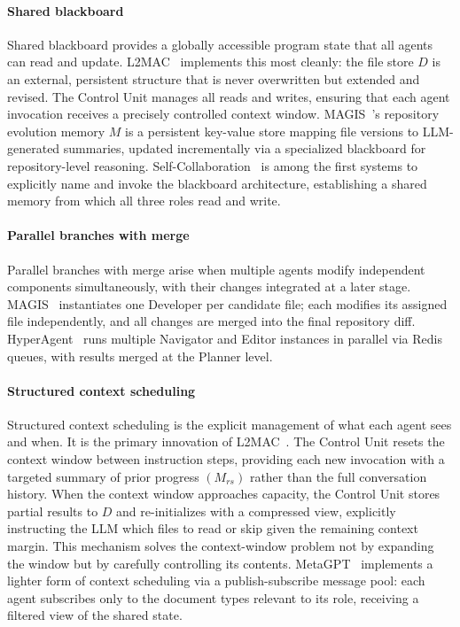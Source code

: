\paragraph{Shared blackboard} Shared blackboard provides a
globally accessible program state that all agents can read and
update. L2MAC~\cite{Holt2023L2MAC} implements this most cleanly:
the file store $D$ is an external, persistent structure that is
never overwritten but extended and revised. The Control Unit
manages all reads and writes, ensuring that each agent invocation
receives a precisely controlled context window.
MAGIS~\cite{Tao2024Magis}'s repository evolution memory $M$ is a
persistent key-value store mapping file versions to
LLM-generated summaries, updated incrementally via a specialized
blackboard for repository-level reasoning.
Self-Collaboration~\cite{Dong2024SelfCollaboration} is among the
first systems to explicitly name and invoke the blackboard
architecture, establishing a shared memory from which all three
roles read and write.

\paragraph{Parallel branches with merge} Parallel branches with
merge arise when multiple agents modify independent components
simultaneously, with their changes integrated at a later stage.
MAGIS~\cite{Tao2024Magis} instantiates one Developer per
candidate file; each modifies its assigned file independently,
and all changes are merged into the final repository diff.
HyperAgent~\cite{Phan2024HyperAgent} runs multiple Navigator and
Editor instances in parallel via Redis queues, with results
merged at the Planner level.

\paragraph{Structured context scheduling} Structured context
scheduling is the explicit management of what each agent sees and
when. It is the primary innovation of
L2MAC~\cite{Holt2023L2MAC}. The Control Unit resets the context
window between instruction steps, providing each new invocation
with a targeted summary of prior progress $(M_{rs})$ rather than
the full conversation history. When the context window approaches
capacity, the Control Unit stores partial results to $D$ and
re-initializes with a compressed view, explicitly instructing the
LLM which files to read or skip given the remaining context
margin. This mechanism solves the context-window problem not by
expanding the window but by carefully controlling its contents.
MetaGPT~\cite{Hong2023MetaGPT} implements a lighter form of
context scheduling via a publish-subscribe message pool: each
agent subscribes only to the document types relevant to its role,
receiving a filtered view of the shared state.

